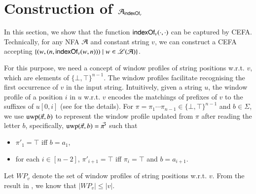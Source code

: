 

\section{Construction of $\mathcal{A}_{\mathsf{indexOf}_v}$} \label{appendix:cefa_indexof}

In this section, we show that the function $\mathsf{indexOf}_v(\cdot, \cdot)$ can be captured by CEFA. Technically, for any NFA $\mathcal{A}$ and constant string $v$, we can construct a CEFA %
accepting $\{(w, (n, \mathsf{indexOf}_v(w, n)))\mid w\in \mathscr{L}(\mathcal{A}) \}$. %

For this purpose, we need a concept of window profiles of  string positions w.r.t. $v$, which are elements of $\{\bot, \top\}^{n-1}$. The window profiles facilitate recognising the first occurrence of $v$ in the input string. 
Intuitively, given a string $u$, the window profile of a position $i$ in $u$ w.r.t. $v$ encodes the matchings of prefixes of $v$ to the suffixes of $u[0,i]$ (see \cite{CCH+18} for the details). For $\pi = \pi_1 \cdots \pi_{n-1} \in \{\bot, \top\}^{n-1}$ and $b \in \Sigma$, we use ${\rm uwp}(\vec{\pi}, b)$ to represent the window profile updated from $\pi$ after reading the letter $b$, specifically, ${\rm uwp}(\vec{\pi}, b) = \vec{\pi'}$ such that  
\begin{itemize}
\item $\pi'_1 = \top$ iff $b = a_1$, 
%
\item for each $i \in [n-2]$, $\pi'_{i+1} = \top$ iff $\pi_{i} = \top$ and $b = a_{i+1}$. 
\end{itemize}
Let $WP_v$ denote the set of window profiles of string positions w.r.t. $v$. From the result in \cite{CCH+18}, we know that $|WP_v| \le |v|$. 
%
%

